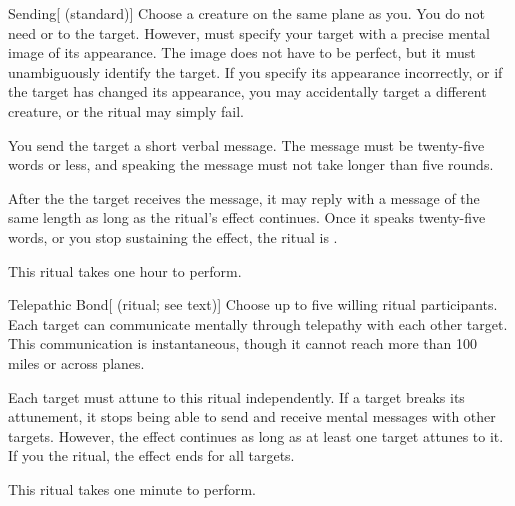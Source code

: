 \lowercase{\hypertarget{spell:Sending}{}}\label{spell:Sending}
\begin{apability}[\nth{3}]{\hypertarget{spell:Sending}{Sending}}[ (standard)]
Choose a creature on the same plane as you.
You do not need  or  to the target.
However,  must specify your target with a precise mental image of its appearance.
The image does not have to be perfect, but it must unambiguously identify the target.
If you specify its appearance incorrectly, or if the target has changed its appearance, you may accidentally target a different creature, or the ritual may simply fail.

You send the target a short verbal message.
The message must be twenty-five words or less, and speaking the message must not take longer than five rounds.

After the the target receives the message, it may reply with a message of the same length as long as the ritual's effect continues.
Once it speaks twenty-five words, or you stop sustaining the effect, the ritual is .

This ritual takes one hour to perform.
\end{apability}
\vspace{0.25em}



\lowercase{\hypertarget{spell:Telepathic Bond}{}}\label{spell:Telepathic Bond}
\begin{attuneability}[\nth{3}]{\hypertarget{spell:Telepathic Bond}{Telepathic Bond}}[ (ritual; see text)]
Choose up to five willing ritual participants.
Each target can communicate mentally through telepathy with each other target.
This communication is instantaneous, though it cannot reach more than 100 miles or across planes.

Each target must attune to this ritual independently.
If a target breaks its attunement, it stops being able to send and receive mental messages with other targets.
However, the effect continues as long as at least one target attunes to it.
If you  the ritual, the effect ends for all targets.

This ritual takes one minute to perform.
\end{attuneability}
\vspace{0.25em}



